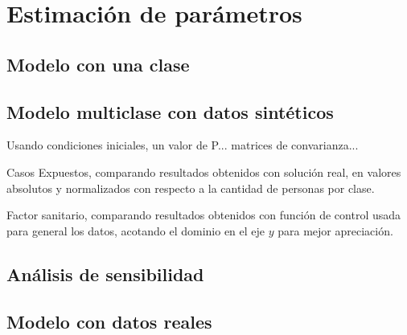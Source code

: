\section{Estimación de parámetros}

\subsection{Modelo con una clase}
\subsection{Modelo multiclase con datos sintéticos}

Usando condiciones iniciales, un valor de P... matrices de convarianza... 


\begin{images}[\label{synth-e-comp-high}]{Casos Expuestos, comparando resultados obtenidos con solución real, en valores absolutos y normalizados con respecto a la cantidad de personas por clase.}
\end{images}

\begin{images}[\label{synth-alpha-comp-high}]{Factor sanitario, comparando resultados obtenidos con función de control usada para general los datos, acotando el dominio en el eje \(y\) para mejor apreciación.}
\end{images}


\subsection{Análisis de sensibilidad}
\subsection{Modelo con datos reales}



